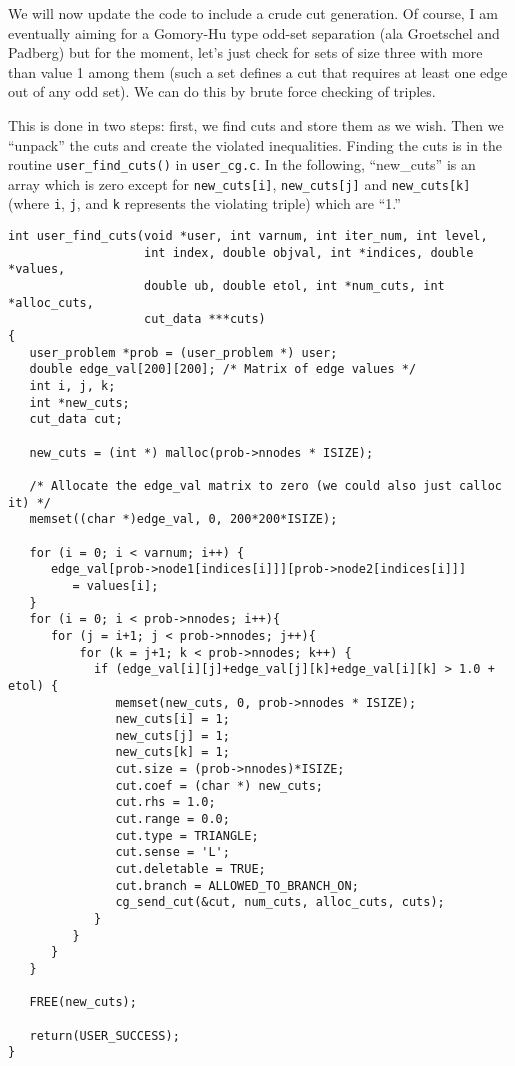 \documentclass[11pt]{article}
\begin{document}
We will now update the code to include a crude cut generation. Of course, I am
eventually aiming for a Gomory-Hu type odd-set separation (ala Groetschel and
Padberg) but for the moment, let's just check for sets of size three with more
than value 1 among them (such a set defines a cut that requires at least one
edge out of any odd set). We can do this by brute force checking of triples.

This is done in two steps: first, we find cuts and store them as we wish. Then
we ``unpack'' the cuts and create the violated inequalities. Finding the cuts
is in the routine \texttt{user\_find\_cuts()} in \texttt{user\_cg.c}. In the
following, ``new\_cuts'' is an array which is zero except for 
\texttt{new\_cuts[i]}, \texttt{new\_cuts[j]} and \texttt{new\_cuts[k]} 
(where \texttt{i}, \texttt{j}, and \texttt{k} represents the violating triple) 
which are ``1.''

\begin{verbatim}
int user_find_cuts(void *user, int varnum, int iter_num, int level,
                   int index, double objval, int *indices, double *values,
                   double ub, double etol, int *num_cuts, int *alloc_cuts, 
                   cut_data ***cuts)
{
   user_problem *prob = (user_problem *) user;
   double edge_val[200][200]; /* Matrix of edge values */
   int i, j, k;
   int *new_cuts;
   cut_data cut;
   
   new_cuts = (int *) malloc(prob->nnodes * ISIZE);

   /* Allocate the edge_val matrix to zero (we could also just calloc it) */
   memset((char *)edge_val, 0, 200*200*ISIZE);
   
   for (i = 0; i < varnum; i++) {
      edge_val[prob->node1[indices[i]]][prob->node2[indices[i]]] 
         = values[i];
   }
   for (i = 0; i < prob->nnodes; i++){
      for (j = i+1; j < prob->nnodes; j++){
          for (k = j+1; k < prob->nnodes; k++) {
            if (edge_val[i][j]+edge_val[j][k]+edge_val[i][k] > 1.0 + etol) {
               memset(new_cuts, 0, prob->nnodes * ISIZE);
               new_cuts[i] = 1; 
               new_cuts[j] = 1;
               new_cuts[k] = 1;
               cut.size = (prob->nnodes)*ISIZE;
               cut.coef = (char *) new_cuts;
               cut.rhs = 1.0;
               cut.range = 0.0;
               cut.type = TRIANGLE;
               cut.sense = 'L';
               cut.deletable = TRUE;
               cut.branch = ALLOWED_TO_BRANCH_ON;
               cg_send_cut(&cut, num_cuts, alloc_cuts, cuts);
            }
         }
      }
   }
   
   FREE(new_cuts);
   
   return(USER_SUCCESS);
}

\end{verbatim}
\end{document}
